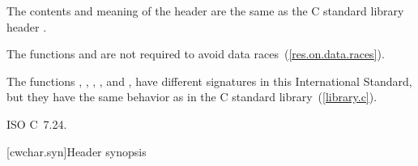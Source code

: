 \pnum
{}%
%
The contents and meaning of the header 
are the same as the C standard library header .

\pnum
The functions  and  are not required to avoid data
races~(\ref{res.on.data.races}).

\pnum
\begin{note}
The functions
, , , , and ,
have different signatures in this International Standard,
but they have the same behavior as in the C standard library~(\ref{library.c}).
\end{note}

\xref ISO C~7.24.

[cwchar.syn]{Header  synopsis}

